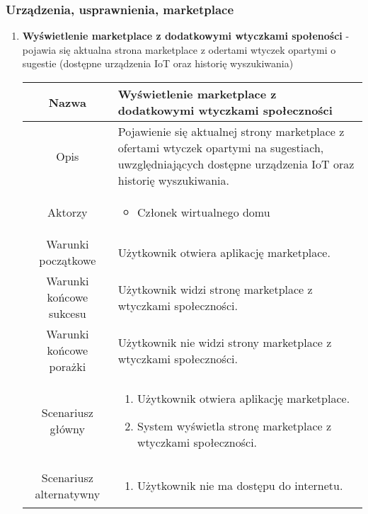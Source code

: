 \documentclass{article}
\begin{document}
\begin{enumerate}
		\subsubsection{Urządzenia, usprawnienia, marketplace}
		\begin{enumerate}
			\item \textbf{Wyświetlenie marketplace z dodatkowymi wtyczkami społeności}
				- pojawia się aktualna strona marketplace z odertami wtyczek opartymi o
				sugestie (dostępne urządzenia IoT oraz historię wyszukiwania)
				\begin{table}[H]
					\centering
					\begin{tabular}{|c|p{7cm}|}
						\hline
						Nazwa                   & \textbf{Wyświetlenie marketplace z dodatkowymi wtyczkami społeczności}                                                                                      \\
						\hline
						Opis                    & Pojawienie się aktualnej strony marketplace z ofertami wtyczek opartymi na sugestiach, uwzględniających dostępne urządzenia IoT oraz historię wyszukiwania. \\
						\hline
						Aktorzy                 & \begin{itemize}\item Członek wirtualnego domu\end{itemize}                                                                                                  \\
						\hline
						Warunki początkowe      & Użytkownik otwiera aplikację marketplace.                                                                                                                   \\
						\hline
						Warunki końcowe sukcesu & Użytkownik widzi stronę marketplace z wtyczkami społeczności.                                                                                               \\
						\hline
						Warunki końcowe porażki & Użytkownik nie widzi strony marketplace z wtyczkami społeczności.                                                                                           \\
						\hline
						Scenariusz główny       & \begin{enumerate}\item Użytkownik otwiera aplikację marketplace.

\item System wyświetla stronę marketplace z wtyczkami społeczności.\end{enumerate}        \\
						\hline
						Scenariusz alternatywny & \begin{enumerate}\item Użytkownik nie ma dostępu do internetu.


\end{enumerate}
\end{tabular}
\end{table}
\end{enumerate}
\end{enumerate}
\end{document}
